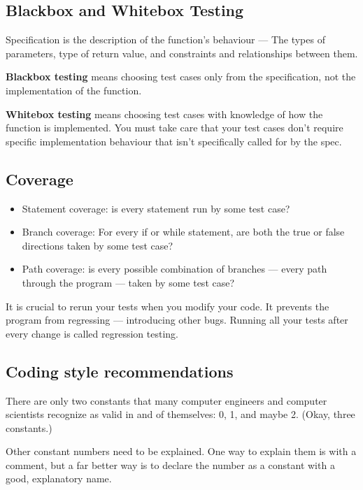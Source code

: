 \documentclass[letterpaper,12pt]{article}
\begin{document}
\subsection{Blackbox and Whitebox Testing}

Specification is the description of the function's behaviour --- The types of
parameters, type of return value, and constraints and relationships between
them.

\textbf{Blackbox testing} means choosing test cases only from the specification, not the implementation of the function.

\textbf{Whitebox testing} means choosing test cases with knowledge of how the function is implemented.
You must take care that your test cases don't require specific implementation behaviour that isn't specifically called for by the spec.

\subsection{Coverage}

\begin{itemize}
      \item Statement coverage: is every statement run by some test case?
      \item Branch coverage: For every if or while statement, are both the true or false
            directions taken by some test case?
      \item Path coverage: is every possible combination of branches --- every path through
            the program --- taken by some test case?
\end{itemize}

It is crucial to rerun your tests when you modify your code. It prevents the program
from regressing --- introducing other bugs. Running all your tests after every
change is called regression testing.

\subsection{Coding style recommendations}

There are only two constants that many computer engineers and computer
scientists recognize as valid in and of themselves: 0, 1, and maybe 2. (Okay,
three constants.)

Other constant numbers need to be explained. One way to explain them is with a
comment, but a far better way is to declare the number as a constant with a
good, explanatory name.
\end{document}
